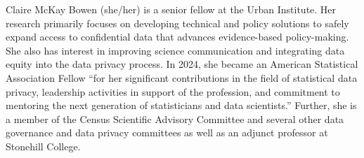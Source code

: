 
Claire McKay Bowen (she/her) is a senior fellow at the Urban Institute. Her research primarily focuses on developing technical and policy solutions to safely expand access to confidential data that advances evidence-based policy-making. She also has interest in improving science communication and integrating data equity into the data privacy process. In 2024, she became an American Statistical Association Fellow ``for her significant contributions in the field of statistical data privacy, leadership activities in support of the profession, and commitment to mentoring the next generation of statisticians and data scientists.'' Further, she is a member of the Census Scientific Advisory Committee and several other data governance and data privacy committees as well as an adjunct professor at Stonehill College.